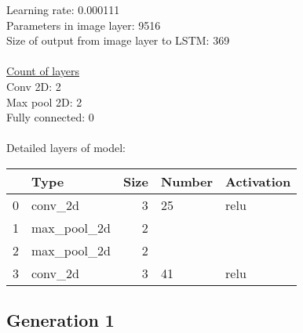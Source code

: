 Learning rate: 0.000111
\\Parameters in image layer: 9516
\\Size of output from image layer to LSTM: 369
\\\\\underline{Count of layers} 
\\Conv 2D:           2\\Max pool 2D:      2\\Fully connected:  0
\\\\Detailed layers of model: \\\begin{tabular}{rlrll}
\hline
    & Type        &   Size & Number   & Activation   \\
\hline
  0 & conv\_2d     &      3 & 25       & relu         \\
  1 & max\_pool\_2d &      2 &          &              \\
  2 & max\_pool\_2d &      2 &          &              \\
  3 & conv\_2d     &      3 & 41       & relu         \\
\hline
\end{tabular}\subsection{Generation 1}
